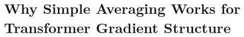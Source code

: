 \documentclass[11pt]{report}
\begin{document}
\chapter{Why Simple Averaging Works for Transformer Gradient Structure}



\newpage



\newpage



%


\newpage
\newpage

\end{document}

